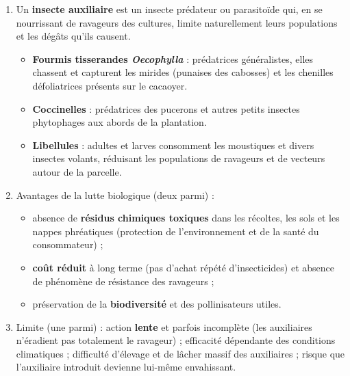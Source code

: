 \documentclass[11pt]{article}
\begin{document}
\begin{corrige}
\begin{enumerate}
\item Un \textbf{insecte auxiliaire} est un insecte prédateur ou parasitoïde qui, en se nourrissant de ravageurs des cultures, limite naturellement leurs populations et les dégâts qu'ils causent.
\begin{itemize}
\item \textbf{Fourmis tisserandes \emph{Oecophylla}} : prédatrices généralistes, elles chassent et capturent les mirides (punaises des cabosses) et les chenilles défoliatrices présents sur le cacaoyer.
\item \textbf{Coccinelles} : prédatrices des pucerons et autres petits insectes phytophages aux abords de la plantation.
\item \textbf{Libellules} : adultes et larves consomment les moustiques et divers insectes volants, réduisant les populations de ravageurs et de vecteurs autour de la parcelle.
\end{itemize}
\item Avantages de la lutte biologique (deux parmi) :
\begin{itemize}
\item absence de \textbf{résidus chimiques toxiques} dans les récoltes, les sols et les nappes phréatiques (protection de l'environnement et de la santé du consommateur) ;
\item \textbf{coût réduit} à long terme (pas d'achat répété d'insecticides) et absence de phénomène de résistance des ravageurs ;
\item préservation de la \textbf{biodiversité} et des pollinisateurs utiles.
\end{itemize}
\item Limite (une parmi) : action \textbf{lente} et parfois incomplète (les auxiliaires n'éradient pas totalement le ravageur) ; efficacité dépendante des conditions climatiques ; difficulté d'élevage et de lâcher massif des auxiliaires ; risque que l'auxiliaire introduit devienne lui-même envahissant.
\end{enumerate}
\end{corrige}
\end{document}
